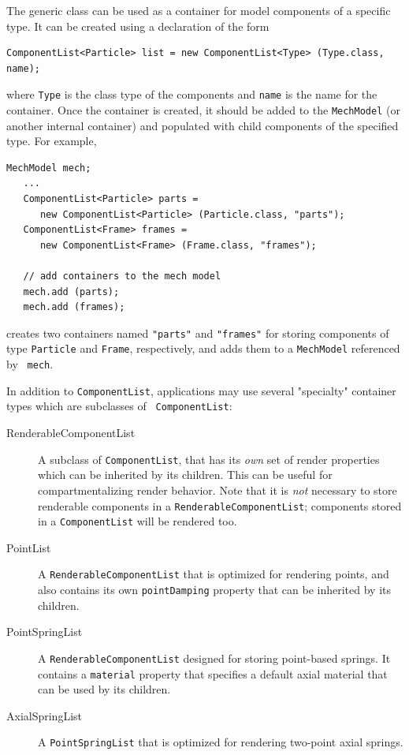 The generic class 
can be used as a container for model components of a specific type.
It can be created using a declaration of the form
%
\begin{lstlisting}[]
   ComponentList<Particle> list = new ComponentList<Type> (Type.class, name);
\end{lstlisting}
%
where {\tt Type} is the class type of the components and {\tt name} is
the name for the container. Once the container is created, it should
be added to the {\tt MechModel} (or another internal container) and 
populated with child components of the specified type.
For example,
\begin{lstlisting}[]
   MechModel mech; 
   ...
   ComponentList<Particle> parts = 
      new ComponentList<Particle> (Particle.class, "parts");
   ComponentList<Frame> frames = 
      new ComponentList<Frame> (Frame.class, "frames");

   // add containers to the mech model
   mech.add (parts); 
   mech.add (frames);
\end{lstlisting}
creates two containers named {\tt "parts"} and {\tt "frames"} for
storing components of type {\tt Particle} and {\tt Frame},
respectively, and adds them to a {\tt MechModel} referenced by {\tt
mech}.

In addition to {\tt ComponentList}, applications may use several
"specialty" container types which are subclasses of {\tt
ComponentList}:

\begin{description}

\item[RenderableComponentList]\mbox{}

A subclass of {\tt ComponentList}, that
has its {\it own} set of render properties which can be inherited by
its children. This can be useful for compartmentalizing render
behavior.  Note that it is {\it not} necessary to store renderable
components in a {\tt RenderableComponentList}; components stored in a
{\tt ComponentList} will be rendered too.

\item[PointList]\mbox{}

A {\tt RenderableComponentList} that is optimized for
rendering points, and also contains its own {\tt pointDamping}
property that can be inherited by its children.

\item[PointSpringList]\mbox{}

A {\tt RenderableComponentList} designed for
storing point-based springs. It contains a {\tt material} property that
specifies a default axial material that can be used by its children.

\item[AxialSpringList]\mbox{}

A {\tt PointSpringList} that is optimized for
rendering two-point axial springs.

\end{description}

